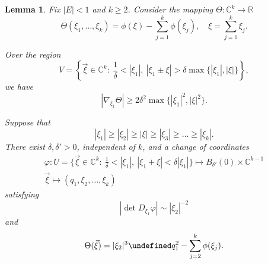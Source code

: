 \documentclass[a4paper,
11pt,  reqno]{amsart}
\newcommand{\5}{\textup{V}}
\newcommand{\noi}{\noindent}
\newtheorem{lemma}[theorem]{Lemma}
\theoremstyle{remark}
\newcommand{\R}{\mathbb{R}}
\newcommand{\CC}{\mathbb{C}}
\let\Re=\undefined\DeclareMathOperator*{\Re}{Re}
\numberwithin{equation}{section}
\numberwithin{theorem}{section}
\providecommand{\DIFaddbegin}{} %
\providecommand{\DIFaddend}{} %
\providecommand{\DIFdelbegin}{} %
\providecommand{\DIFdelend}{} %
\begin{document}
\DIFdelend \begin{lemma}\label{lem:prop_resonance}
Fix $|E|<1$ and $k\ge 2$. Consider the mapping $\Theta:\CC^{k}\to \R$
\DIFdelbegin %
\DIFdelend \DIFaddbegin $$
\Theta(\xi_1,\dots, \xi_{k})= \phi(\xi)-\sum_{j=1}^k \phi(\xi_j),\quad \xi=\sum_{j=1}^{k} \xi_j.
$$\DIFaddend 

\noi{\rm (i)} Over the region
\begin{equation}
V=\left\{\vec{\xi}\in \CC^{k} :\  \frac{1}{\delta}<|\xi_1|,\  |\xi_1\pm\xi|>\delta\max\{|\xi_1|, |\xi|\}\right\},
\end{equation}
we have
$$
|\nabla_{\xi_1}\Theta|\ge 2\delta^2\max\{|\xi_1|^2, |\xi|^2\}.
$$

\noi{\rm (ii)} Suppose that
$$
|\xi_1|\ge |\xi_2| \ge |\xi|\ge |\xi_3|\ge \dots \ge |\xi_k|.
$$
There exist $\delta, \delta'>0$, independent of $k$, and a change of coordinates
\DIFdelbegin %
\DIFdelend \DIFaddbegin \begin{align*}
\varphi:U=\{\vec{\xi}\in \CC^{k} :\  \tfrac{1}{\delta}<|\xi_1|,\  |\xi_1+\xi|<\delta|\xi_1|\} \mapsto B_{\delta'}(0)\times \CC^{k-1}\\ \vec{\xi}\mapsto (q_1, \xi_2, \dots, \xi_k)
\end{align*}\DIFaddend 
satisfying
\begin{equation}\label{eq:nondeg}
|\det D_{\xi_1}\varphi| \sim |\xi_2|^{-2}
\end{equation}
and
\DIFdelbegin %
\DIFdelend \DIFaddbegin $$
\Theta(\vec{\xi})=|\xi_2|^3\Re q_1^2 - \sum_{j=2}^k \phi(\xi_j).
$$\DIFaddend 

\end{lemma}
\end{document}
